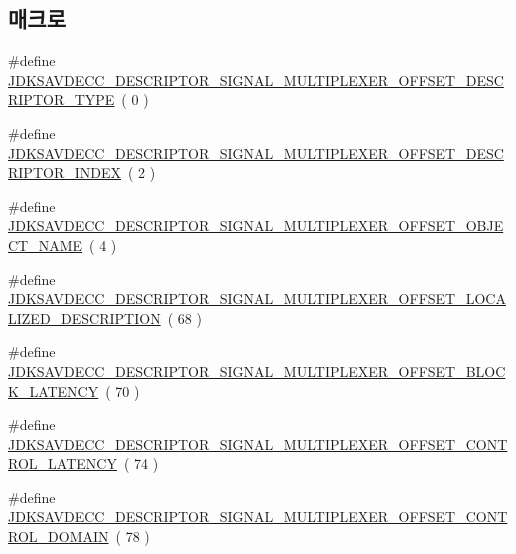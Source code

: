 \subsection*{매크로}
\begin{DoxyCompactItemize}
\item 
\#define \hyperlink{group__descriptor__signal__multiplexer_gac835f2cd9cc012a83078fec00d2adc17}{J\+D\+K\+S\+A\+V\+D\+E\+C\+C\+\_\+\+D\+E\+S\+C\+R\+I\+P\+T\+O\+R\+\_\+\+S\+I\+G\+N\+A\+L\+\_\+\+M\+U\+L\+T\+I\+P\+L\+E\+X\+E\+R\+\_\+\+O\+F\+F\+S\+E\+T\+\_\+\+D\+E\+S\+C\+R\+I\+P\+T\+O\+R\+\_\+\+T\+Y\+PE}~( 0 )
\item 
\#define \hyperlink{group__descriptor__signal__multiplexer_ga03a1c35b8d4ce72ae90cbbe7d208512b}{J\+D\+K\+S\+A\+V\+D\+E\+C\+C\+\_\+\+D\+E\+S\+C\+R\+I\+P\+T\+O\+R\+\_\+\+S\+I\+G\+N\+A\+L\+\_\+\+M\+U\+L\+T\+I\+P\+L\+E\+X\+E\+R\+\_\+\+O\+F\+F\+S\+E\+T\+\_\+\+D\+E\+S\+C\+R\+I\+P\+T\+O\+R\+\_\+\+I\+N\+D\+EX}~( 2 )
\item 
\#define \hyperlink{group__descriptor__signal__multiplexer_ga6f6d398ab99161da66e7615bcf248302}{J\+D\+K\+S\+A\+V\+D\+E\+C\+C\+\_\+\+D\+E\+S\+C\+R\+I\+P\+T\+O\+R\+\_\+\+S\+I\+G\+N\+A\+L\+\_\+\+M\+U\+L\+T\+I\+P\+L\+E\+X\+E\+R\+\_\+\+O\+F\+F\+S\+E\+T\+\_\+\+O\+B\+J\+E\+C\+T\+\_\+\+N\+A\+ME}~( 4 )
\item 
\#define \hyperlink{group__descriptor__signal__multiplexer_ga0ded81804b54c9af257643b2d23079f1}{J\+D\+K\+S\+A\+V\+D\+E\+C\+C\+\_\+\+D\+E\+S\+C\+R\+I\+P\+T\+O\+R\+\_\+\+S\+I\+G\+N\+A\+L\+\_\+\+M\+U\+L\+T\+I\+P\+L\+E\+X\+E\+R\+\_\+\+O\+F\+F\+S\+E\+T\+\_\+\+L\+O\+C\+A\+L\+I\+Z\+E\+D\+\_\+\+D\+E\+S\+C\+R\+I\+P\+T\+I\+ON}~( 68 )
\item 
\#define \hyperlink{group__descriptor__signal__multiplexer_ga8aee7715d5f15d5e5e642bde3d7c04f9}{J\+D\+K\+S\+A\+V\+D\+E\+C\+C\+\_\+\+D\+E\+S\+C\+R\+I\+P\+T\+O\+R\+\_\+\+S\+I\+G\+N\+A\+L\+\_\+\+M\+U\+L\+T\+I\+P\+L\+E\+X\+E\+R\+\_\+\+O\+F\+F\+S\+E\+T\+\_\+\+B\+L\+O\+C\+K\+\_\+\+L\+A\+T\+E\+N\+CY}~( 70 )
\item 
\#define \hyperlink{group__descriptor__signal__multiplexer_ga336f0bfe087361673c270f50be6393a3}{J\+D\+K\+S\+A\+V\+D\+E\+C\+C\+\_\+\+D\+E\+S\+C\+R\+I\+P\+T\+O\+R\+\_\+\+S\+I\+G\+N\+A\+L\+\_\+\+M\+U\+L\+T\+I\+P\+L\+E\+X\+E\+R\+\_\+\+O\+F\+F\+S\+E\+T\+\_\+\+C\+O\+N\+T\+R\+O\+L\+\_\+\+L\+A\+T\+E\+N\+CY}~( 74 )
\item 
\#define \hyperlink{group__descriptor__signal__multiplexer_ga68273ac6f998262001065e2a805f7908}{J\+D\+K\+S\+A\+V\+D\+E\+C\+C\+\_\+\+D\+E\+S\+C\+R\+I\+P\+T\+O\+R\+\_\+\+S\+I\+G\+N\+A\+L\+\_\+\+M\+U\+L\+T\+I\+P\+L\+E\+X\+E\+R\+\_\+\+O\+F\+F\+S\+E\+T\+\_\+\+C\+O\+N\+T\+R\+O\+L\+\_\+\+D\+O\+M\+A\+IN}~( 78 )

\end{DoxyCompactItemize}

